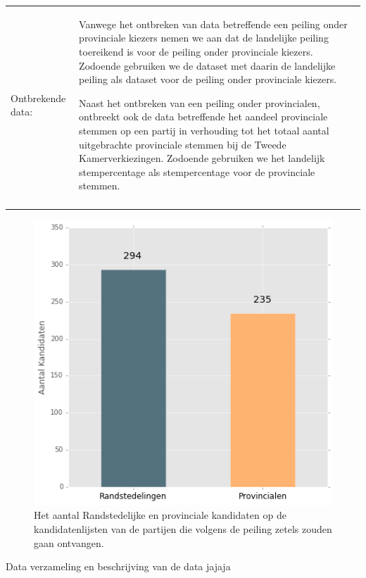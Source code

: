 \noindent\begin{tabularx}{\textwidth}{LI}
Ontbrekende data: &   Vanwege het ontbreken van data betreffende een peiling onder provinciale kiezers nemen we aan dat de landelijke peiling toereikend is voor de peiling onder provinciale kiezers. Zodoende gebruiken we de dataset met daarin de landelijke peiling als dataset voor de peiling onder provinciale kiezers.

\hspace*{1em} Naast het ontbreken van een peiling onder provincialen, ontbreekt ook de data betreffende het aandeel provinciale stemmen op een partij in verhouding tot het totaal aantal uitgebrachte provinciale stemmen bij de Tweede Kamerverkiezingen. Zodoende gebruiken we het landelijk stempercentage als stempercentage voor de provinciale stemmen.\\
\\
 \end{tabularx}



\begin{figure}[H]
\centering
	\includegraphics[width=0.42\linewidth]{rp_kandidaten.png}

			\caption{Het aantal Randstedelijke en provinciale kandidaten op de kandidatenlijsten van de partijen die volgens de peiling zetels zouden gaan ontvangen.}

\label{fig:rpKandidaten}
\end{figure}

















\iffalse

Data verzameling en beschrijving van de data jajaja

